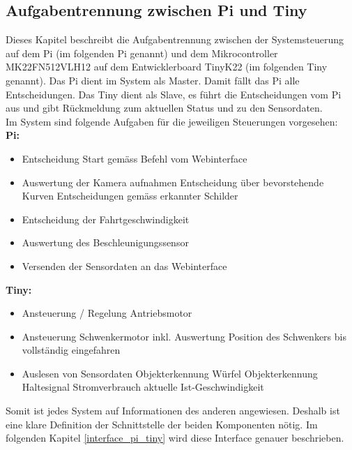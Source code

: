 \documentclass[../../main.tex]{subfiles}
\begin{document}
    \subsection{Aufgabentrennung zwischen Pi und Tiny} \label{aufgabentrennung_pi_tiny}
    Dieses Kapitel beschreibt die Aufgabentrennung zwischen der Systemsteuerung auf dem Pi (im folgenden Pi genannt) und dem Mikrocontroller MK22FN512VLH12 auf dem Entwicklerboard TinyK22 (im folgenden Tiny genannt). Das Pi dient im System als Master. Damit fällt das Pi alle Entscheidungen. Das Tiny dient als Slave, es führt die Entscheidungen vom Pi aus und gibt Rückmeldung zum aktuellen Status und zu den Sensordaten.\\
    Im System sind folgende Aufgaben für die jeweiligen Steuerungen vorgesehen:\\
    \textbf{Pi:}
    \begin{itemize}
        \item Entscheidung Start gemäss Befehl vom Webinterface
        \item Auswertung der Kamera aufnahmen
            \subitem Entscheidung über bevorstehende Kurven
            \subitem Entscheidungen gemäss erkannter Schilder
        \item Entscheidung der Fahrtgeschwindigkeit
        \item Auswertung des Beschleunigungssensor
        \item Versenden der Sensordaten an das Webinterface
    \end{itemize}

    \textbf{Tiny:}
    \begin{itemize}
        \item Ansteuerung / Regelung Antriebsmotor
        \item Ansteuerung Schwenkermotor
            \subitem inkl. Auswertung Position des Schwenkers bis vollständig eingefahren
        \item Auslesen von Sensordaten
            \subitem Objekterkennung Würfel
            \subitem Objekterkennung Haltesignal
            \subitem Stromverbrauch
            \subitem aktuelle Ist-Geschwindigkeit
    \end{itemize}

    Somit ist jedes System auf Informationen des anderen angewiesen. Deshalb ist eine klare Definition der Schnittstelle der beiden Komponenten nötig. Im folgenden Kapitel \ref{interface_pi_tiny} wird diese Interface genauer beschrieben.
\end{document}
